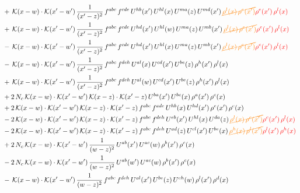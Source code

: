 \documentclass[9pt]{article}
\numberwithin{equation}{section}
\begin{document}
\begin{align}
&+\,\mathcal{K}(x-w)\cdot\mathcal{K}(x'-w')\,\frac{1}{(x'-z)^{2}}\,f^{abc}\,f^{cde}\,U^{hb}(x')\,U^{hl}(x)\,U^{ma}(z)\,U^{md}(x')\,{\color{orange}\cancel{\rho^{l}(x)\,\rho^{e}(x')}}{\color{red}\rho^{e}(x')\,\rho^{l}(x)}\notag\\
&+\,\mathcal{K}(x-w)\cdot\mathcal{K}(x'-w')\,\frac{1}{(x'-z)^{2}}\,f^{abc}\,f^{cde}\,U^{hd}(x')\,U^{hl}(w)\,U^{ma}(z)\,U^{mb}(x')\,{\color{orange}\cancel{\rho^{l}(x)\,\rho^{e}(x')}}{\color{red}\rho^{e}(x')\,\rho^{l}(x)}\notag\\
&-\,\mathcal{K}(x-w)\cdot\mathcal{K}(x'-w')\,\frac{1}{(x'-z)^{2}}\,f^{abc}\,f^{cde}\,U^{hd}(x')\,U^{hl}(x)\,U^{ma}(z)\,U^{mb}(x')\,{\color{orange}\cancel{\rho^{l}(x)\,\rho^{e}(x')}}{\color{red}\rho^{e}(x')\,\rho^{l}(x)}\notag\\
&-\,\mathcal{K}(x-w)\cdot\mathcal{K}(x'-w')\,\frac{1}{(x'-z)^{2}}\,f^{abc}\,f^{deh}\,U^{al}(x)\,U^{cd}(x')\,U^{be}(z)\,\rho^{h}(x')\,\rho^{l}(x)\notag\\
&+\,\mathcal{K}(x-w)\cdot\mathcal{K}(x'-w')\,\frac{1}{(x'-z)^{2}}\,f^{abc}\,f^{deh}\,U^{al}(w)\,U^{cd}(x')\,U^{be}(z)\,\rho^{h}(x')\,\rho^{l}(x)\notag\\
&+2\,N_{c}\,\mathcal{K}(x-w)\cdot\mathcal{K}(x'-w')\,\mathcal{K}(x-z)\cdot\mathcal{K}(x'-z)\,U^{ba}(x')\,U^{bc}(x)\,\rho^{a}(x')\,\rho^{c}(x)\notag\\
&+2\,\mathcal{K}(x-w)\cdot\mathcal{K}(x'-w')\,\mathcal{K}(x-z)\cdot\mathcal{K}(x'-z)\,f^{abc}\,f^{ade}\,U^{hb}(x)\,U^{hd}(x')\,\rho^{e}(x')\,\rho^{c}(x)\notag\\
&-2\,\mathcal{K}(x-w)\cdot\mathcal{K}(x'-w')\,\mathcal{K}(x-z)\cdot\mathcal{K}(x'-z)\,f^{abc}\,f^{deh}\,U^{eb}(x')\,U^{hl}(x)\,U^{da}(z)\,{\color{orange}\cancel{\rho^{l}(x)\,\rho^{c}(x')}}{\color{red}\rho^{c}(x')\,\rho^{l}(x)}\notag\\
&-2\,\mathcal{K}(x-w)\cdot\mathcal{K}(x'-w')\,\mathcal{K}(x-z)\cdot\mathcal{K}(x'-z)\,f^{abc}\,f^{deh}\,U^{ad}(z)\,U^{cl}(x')\,U^{be}(x)\,{\color{orange}\cancel{\rho^{h}(x)\,\rho^{l}(x')}}{\color{red}\rho^{l}(x')\,\rho^{h}(x)}\notag\\
&+2\,N_{c}\,\mathcal{K}(x-w)\cdot\mathcal{K}(x'-w')\,\frac{1}{(w-z)^{2}}\,U^{ab}(x')\,U^{ac}(w)\,\rho^{b}(x')\,\rho^{c}(x)\notag\\
&-2\,N_{c}\,\mathcal{K}(x-w)\cdot\mathcal{K}(x'-w')\,\frac{1}{(w-z)^{2}}\,U^{ab}(w')\,U^{ac}(w)\,\rho^{b}(x')\,\rho^{c}(x)\notag\\
&-\,\mathcal{K}(x-w)\cdot\mathcal{K}(x'-w')\,\frac{1}{(w-z)^{2}}\,f^{abc}\,f^{deh}\,U^{al}(x')\,U^{be}(z)\,U^{ch}(w)\,\rho^{l}(x')\,\rho^{d}(x)\notag\\

\end{align}
\end{document}
